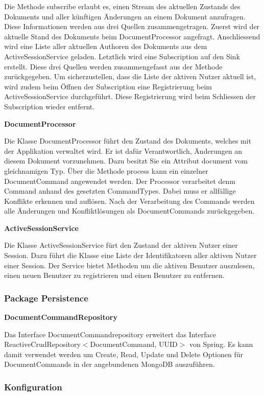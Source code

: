 Die Methode subscribe erlaubt es, einen Stream des aktuellen Zustands des Dokuments und aller künftigen Änderungen an einem Dokument anzufragen.
Diese Informationen werden aus drei Quellen zusammengetragen.
Zuerst wird der aktuelle Stand des Dokuments beim DocumentProcessor angefragt.
Anschliessend wird eine Liste aller aktuellen Authoren des Dokuments aus dem ActiveSessionService geladen.
Letztlich wird eine Subscription auf den Sink erstellt.
Diese drei Quellen werden zusammengefasst aus der Methode zurückgegeben.
Um sicherzustellen, dass die Liste der aktiven Nutzer aktuell ist, wird zudem beim Öffnen der Subscription eine Registrierung beim ActiveSessionService durchgeführt.
Diese Registrierung wird beim Schliessen der Subscription wieder entfernt.

\textbf{DocumentProcessor}

Die Klasse DocumentProcessor führt den Zustand des Dokuments, welches mit der Applikation verwaltet wird.
Er ist dafür Verantwortlich, Änderungen an diesem Dokument vorzunehmen.
Dazu besitzt Sie ein Attribut document vom gleichnamigen Typ.
Über die Methode process kann ein einzelner DocumentCommand angewendet werden.
Der Processor verarbeitet denm Command anhand des gesetzten CommandTypes.
Dabei muss er allfällige Konflikte erkennen und auflösen.
Nach der Verarbeitung des Commands werden alle Änderungen und Konfliktlösungen als DocumentCommands zurückgegeben.

\textbf{ActiveSessionService}

Die Klasse ActiveSessionService fürt den Zustand der aktiven Nutzer einer Session.
Dazu führt die Klasse eine Liste der Identifikatoren aller aktiven Nutzer einer Session.
Der Service bietet Methoden um die aktiven Benutzer auszulesen, einen neuen Benutzer zu registrieren und einen Benutzer zu entfernen.

\subsubsection{Package Persistence}

\textbf{DocumentCommandRepository}

Das Interface DocumentCommandrepository erweitert das Interface ReactiveCrudRepository$<$DocumentCommand, UUID$>$ von Spring.
Es kann damit verwendet werden um Create, Read, Update und Delete Optionen für DocumentCommands in der angebundenen MongoDB auszuführen.

\subsubsection{Konfiguration}

